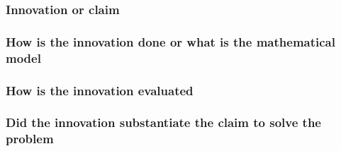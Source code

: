 \documentclass[10pt,twocolumn,letterpaper]{article}
\begin{document}
\subsubsection{Innovation or claim}
\lipsum[1]

\subsubsection{How is the innovation done or what is the mathematical model}
\lipsum[1]

\subsubsection{How is the innovation evaluated}
\lipsum[1]

\subsubsection{Did the innovation substantiate the claim to solve the problem}
\lipsum[1]

\end{document}
